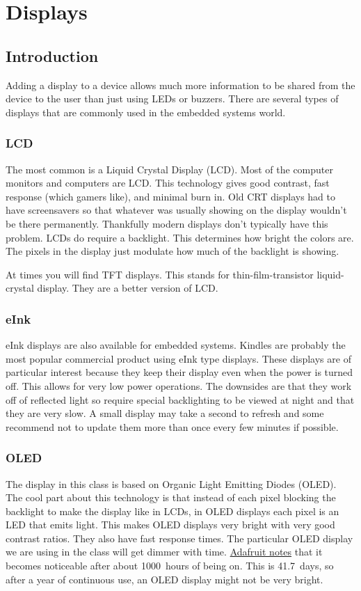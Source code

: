\chapter{Displays}

\section{Introduction}
Adding a display to a device allows much more information to be shared from the device to the user than 
just using LEDs or buzzers. There are several types of displays that are commonly used in the embedded systems 
world. 

\subsection{LCD}
The most common is a Liquid Crystal Display (LCD). Most of the computer monitors and computers are LCD. This 
technology gives good contrast, fast response (which gamers like), and minimal burn in. Old CRT displays had 
to have screensavers so that whatever was usually showing on the display wouldn't be there permanently. 
Thankfully modern displays don't typically have this problem. LCDs do require a backlight. This determines
how bright the colors are. The pixels in the display just modulate how much of the backlight is showing.

At times you will find TFT displays. This stands for thin-film-transistor liquid-crystal display. They are 
a better version of LCD.

\subsection{eInk}
eInk displays are also available for embedded systems. Kindles are probably the most popular commercial 
product using eInk type displays. These displays are of particular interest because they keep their 
display even when the power is turned off. This allows for very low power operations. The downsides are 
that they work off of reflected light so require special backlighting to be viewed at night and that 
they are very slow. A small display may take a second to refresh and some recommend not to update
them more than once every few minutes if possible.

\subsection{OLED}
The display in this class is based on Organic Light Emitting Diodes (OLED). The cool part about this 
technology is that instead of each pixel blocking the backlight to make the display like in LCDs, in 
OLED displays each pixel is an LED that emits light. This makes OLED displays very bright with very 
good contrast ratios. They also have fast response times. The particular OLED display we are using 
in the class will get dimmer with time. \href{https://www.adafruit.com/product/938}{Adafruit notes} 
that it becomes noticeable after about 1000~hours of being on. This is 41.7~days, so after a year of 
continuous use, an OLED display might not be very bright.


